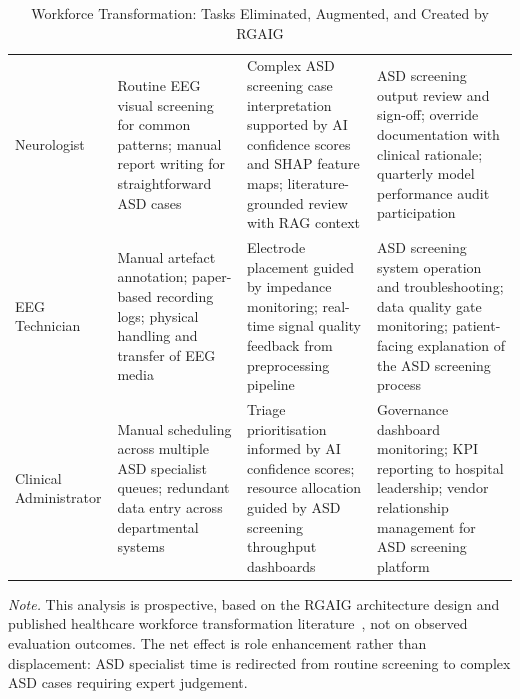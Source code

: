 \begin{table}[H]
\tablestripes
\tablefontsize
\caption[Workforce Transformation by Role]{Workforce Transformation: Tasks Eliminated, Augmented, and Created by RGAIG}
\begin{tabularx}{\textwidth}{@{} p{1.5cm} L L L @{}}
\toprule
{} &  &  &  \\
\midrule
Neurologist & Routine EEG visual screening for common patterns; manual report writing for straightforward ASD cases & Complex ASD screening case interpretation supported by AI confidence scores and SHAP feature maps; literature-grounded review with RAG context & ASD screening output review and sign-off; override documentation with clinical rationale; quarterly model performance audit participation \\
\addlinespace
EEG Technician & Manual artefact annotation; paper-based recording logs; physical handling and transfer of EEG media & Electrode placement guided by impedance monitoring; real-time signal quality feedback from preprocessing pipeline & ASD screening system operation and troubleshooting; data quality gate monitoring; patient-facing explanation of the ASD screening process \\
\addlinespace
Clinical Administrator & Manual scheduling across multiple ASD specialist queues; redundant data entry across departmental systems & Triage prioritisation informed by AI confidence scores; resource allocation guided by ASD screening throughput dashboards & Governance dashboard monitoring; KPI reporting to hospital leadership; vendor relationship management for ASD screening platform \\
\bottomrule
\end{tabularx}
\vspace{0.5em}\noindent\textit{Note.} This analysis is prospective, based on the RGAIG architecture design and published healthcare workforce transformation literature~\cite{topol2019deep}, not on observed evaluation outcomes. The net effect is role enhancement rather than displacement: ASD specialist time is redirected from routine screening to complex ASD cases requiring expert judgement.
\end{table}


